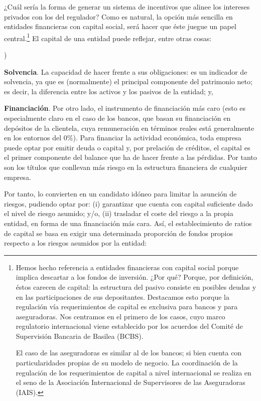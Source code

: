 \documentclass[10pt,a4paper]{article}
\newcounter{alphaitem}
\newenvironment{la}
      {\begin{list}{\alph{alphaitem})}{%
          \usecounter{alphaitem}%
          \setlength{\leftmargin}{1cm}%
          \setlength{\parskip}{3pt}%
          \setlength{\itemsep}{0pt}%
          \setlength{\parsep}{0pt}%
      }}
      {\end{list}}
\begin{document}
¿Cuál sería la forma de generar un sistema de incentivos que alinee los intereses privados con los del regulador? Como es natural, la opción más sencilla en entidades financieras con capital social, será hacer que éste juegue un papel central.\footnote{%
    Hemos hecho referencia a entidades financieras con capital social porque implica descartar a los fondos de inversión. ¿Por qué? Porque, por definición, éstos carecen de capital: la estructura del pasivo consiste en posibles deudas y en las participaciones de sus depositantes. Destacamos esto porque la regulación vía requerimientos de capital es exclusiva para bancos y para aseguradoras. Nos centramos en el primero de los casos, cuyo marco regulatorio internacional viene establecido por los acuerdos del Comité de Supervisión Bancaria de Basilea (BCBS). 

El caso de las aseguradoras es similar al de los bancos; si bien cuenta con particularidades propias de su modelo de negocio. La coordinación de la regulación de los requerimientos de capital a nivel internacional se realiza en el seno de la Asociación Internacional de Supervisores de las Aseguradoras (IAIS).
} El capital de una entidad puede reflejar, entre otras cosas:
\begin{la}
    \item \textbf{Solvencia}. La capacidad de hacer frente a sus obligaciones: es un indicador de solvencia, ya que es (normalmente) el principal componente del patrimonio neto; es decir, la diferencia entre los activos y los pasivos de la entidad; y,
    \item \textbf{Financiación}. Por otro lado, el instrumento de financiación más caro (esto es especialmente claro en el caso de los bancos, que basan su financiación en depósitos de la clientela, cuya remuneración en términos reales está generalmente en los entornos del 0\%). Para financiar la actividad económica, toda empresa puede optar por emitir deuda o capital y, por prelación de créditos, el capital es el primer componente del balance que ha de hacer frente a las pérdidas. Por tanto son los títulos que conllevan más riesgo en la estructura financiera de cualquier empresa.
\end{la}

Por tanto, lo convierten en un candidato idóneo para limitar la asunción de riesgos, pudiendo optar por: (i) garantizar que cuenta con capital suficiente dado el nivel de riesgo asumido; y/o, (ii) trasladar el coste del riesgo a la propia entidad, en forma de una financiación más cara. Así, el establecimiento de ratios de capital se basa en exigir una determinada proporción de fondos propios respecto a los riesgos asumidos por la entidad:
\end{document}

